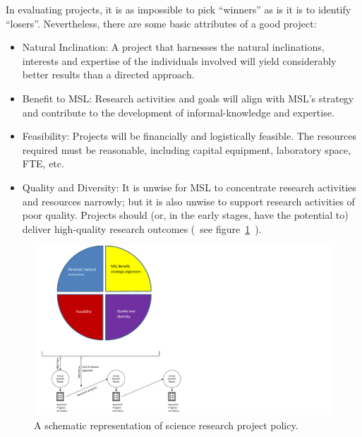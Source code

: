 In evaluating projects, it is as impossible to pick “winners” as is it is to identify “losers”. Nevertheless, there are some basic attributes of a good project:
\begin{itemize}
\item Natural Inclination:  A project that harnesses the natural inclinations, interests and expertise of the individuals involved will yield considerably better results than a directed approach. 

\item Benefit to MSL: Research activities and goals will align with MSL’s strategy and contribute to the development of informal-knowledge and expertise. 

\item Feasibility: Projects will be financially and logistically feasible. The resources required must be reasonable, including capital equipment, laboratory space, FTE, etc.

\item Quality and Diversity: It is unwise for MSL to concentrate research activities and resources narrowly; but it is also unwise to support research activities of poor quality. Projects should (or, in the early stages, have the potential to) deliver high-quality research outcomes (~see figure~\ref{f:science_review}~).
\end{itemize}


\begin{figure}[ht]
\centering
\includegraphics[scale=1]{pictures/science_review}
\caption{A schematic representation of science research project policy.}
\label{f:science_review}
\end{figure}
